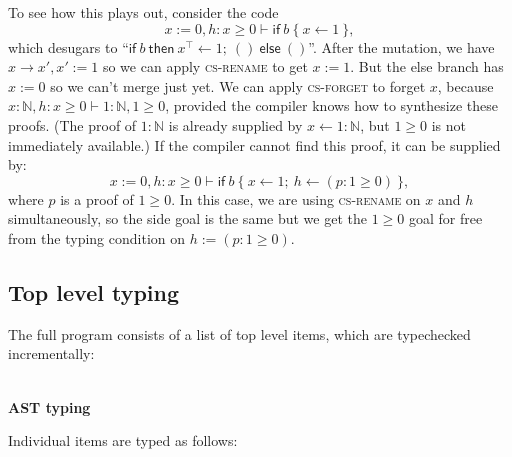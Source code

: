 \documentclass[acmsmall,nonacm]{acmart}
\newcommand*{\N}{\mathbb{N}}
\newcommand{\proves}{\vdash}
\newcommand{\makes}{\dashv}
\newcommand{\judgment}[2][]{\noindent\\\textbf{#1}\hspace{\stretch{1}}\fbox{$#2$}\nopagebreak}
\newcommand*{\axiom}[2][]{\infer[#1]{}{#2}}
\begin{document}
To see how this plays out, consider the code
$$x:=0,h:x\ge 0\proves\mathsf{if}\ b\ \{\ x\gets 1\ \},$$
which desugars to ``$\mathsf{if}\ b\ \mathsf{then}\ x^\top\gets 1;\ ()\ \mathsf{else}\ ()$''. After the mutation, we have $x\to x',x':=1$ so we can apply \textsc{cs-rename} to get $x:=1$. But the else branch has $x:=0$ so we can't merge just yet. We can apply \textsc{cs-forget} to forget $x$, because $x:\N,h:x\ge 0\proves 1:\N,1\ge 0$, provided the compiler knows how to synthesize these proofs. (The proof of $1:\N$ is already supplied by $x\gets 1:\N$, but $1\ge 0$ is not immediately available.) If the compiler cannot find this proof, it can be supplied by:
$$x:=0,h:x\ge 0\proves\mathsf{if}\ b\ \{\ x\gets 1;\ h\gets (p:1\ge 0)\ \},$$
where $p$ is a proof of $1\ge 0$. In this case, we are using \textsc{cs-rename} on $x$ and $h$ simultaneously, so the side goal is the same but we get the $1\ge 0$ goal for free from the typing condition on $h:=(p:1\ge 0)$.

\subsection{Top level typing}

The full program consists of a list of top level items, which are typechecked incrementally:

\judgment[AST typing]{\Gamma\proves \overline{it}\makes \Gamma'}
Individual items are typed as follows:
\end{document}
